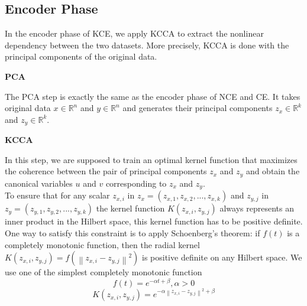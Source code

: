 \documentclass[12pt]{report} %
\newcommand{\norm}[1]{\left\lVert #1 \right\rVert}
\begin{document}
\subsection{Encoder Phase}
In the encoder phase of KCE, we apply KCCA to extract the nonlinear dependency between the two datasets. More precisely, KCCA is done with the principal components of the original data.

\textbf{PCA}

The PCA step is exactly the same as the encoder phase of NCE and CE. It takes original data $x\in \mathbb{R}^{n}$ and $y\in \mathbb{R}^{n}$ and generates their principal components $z_x\in \mathbb{R}^{k}$ and $z_y\in \mathbb{R}^{k}$.

\textbf{KCCA}

In this step, we are supposed to train an optimal kernel function that maximizes the coherence between the pair of principal components $z_x$ and $z_y$ and obtain the canonical variables $u$ and $v$ corresponding to $z_x$ and $z_y$. \\
To ensure that for any scalar \(z_{x,i}\) in \(z_x=(z_{x,1},z_{x,2},...,z_{x,k})\) and \(z_{y,j}\) in \(z_y=(z_{y,1},z_{y,2},...,z_{y,k})\) the kernel function $K(z_{x,i},z_{y,j})$ always represents an inner product in the Hilbert space, this kernel function has to be positive definite. One way to satisfy this constraint is to apply Schoenberg's theorem: if \(f(t)\) is a completely monotonic function, then the radial kernel $K(z_{x,i},z_{y,j})=f(\norm{z_{x,i}-z_{y,j}}^2)$ is positive definite on any Hilbert space. We use one of the simplest completely monotonic function
\begin{equation}
f(t)=e^{-\alpha t + \beta}, \alpha>0
\end{equation}
\begin{equation}
K(z_{x,i},z_{y,j})=e^{-\alpha \norm{z_{x,i}-z_{y,j}}^2 + \beta}
\end{equation}
\end{document}
